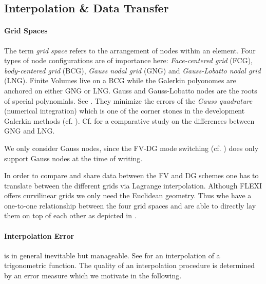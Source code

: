 \subsection{Interpolation \& Data Transfer}
\label{sec:trafo}

\paragraph{Grid Spaces}
The term \emph{grid space} refers to the arrangement of nodes within an
element. Four types of node configurations are of importance here:
\emph{Face-centered grid} (FCG), \emph{body-centered grid} (BCG), \emph{Gauss
nodal grid} (GNG) and \emph{Gauss-Lobatto nodal grid} (LNG). Finite Volumes
live on a BCG while the Galerkin polyonomes are anchored on either GNG or LNG.
Gauss and Gauss-Lobatto nodes are the roots of special polynomials.  See
. They minimize the errors of the \emph{Gauss quadrature}
(numerical integration) which is one of the corner stones in the development
Galerkin methods (cf. ). Cf. 
\cite{gassner2011comparison} for a comparative study on the differences between
GNG and LNG.


We only consider Gauss nodes, since the FV-DG mode switching (cf.
) does only support Gauss nodes at the time of
writing.

In order to compare and share data between the FV and DG schemes one has to
translate between the different grids via Lagrange interpolation.  Although
FLEXI offers curvilinear grids we only need the Euclidean geometry. Thus whe
have a one-to-one relationship between the four grid spaces and are able to
directly lay them on top of each other as depicted in .

\paragraph{Interpolation Error} is in general inevitable but manageable.
See  for an interpolation of a trigonometric
function. The quality of an interpolation procedure is determined by an
error measure which we motivate in the following.

